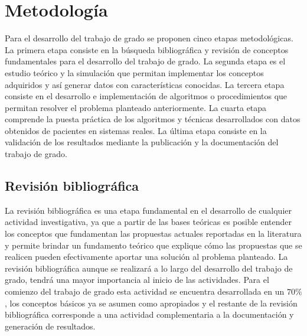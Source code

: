 \section{Metodología}
\label{sec:metodologia}

Para el desarrollo del trabajo de grado se proponen cinco etapas metodológicas. La primera etapa consiste en la búsqueda bibliográfica y revisión de conceptos fundamentales para el desarrollo del trabajo de grado. La segunda etapa es el estudio teórico y la simulación que permitan implementar los conceptos adquiridos y así generar datos con características conocidas. La tercera etapa consiste en el desarrollo e implementación de algoritmos o procedimientos que permitan resolver el problema planteado anteriormente. La cuarta etapa comprende la puesta práctica de los algoritmos y técnicas desarrollados con datos obtenidos de pacientes en sistemas reales. La última etapa consiste en la validación de los resultados mediante la publicación y la documentación del trabajo de grado.

\subsection{Revisión bibliográfica}


La revisión bibliográfica es una etapa fundamental en el desarrollo de cualquier actividad investigativa, ya que a partir de las bases teóricas es posible entender los conceptos que fundamentan las propuestas actuales reportadas en la literatura y permite brindar un fundamento teórico que explique cómo las propuestas que se realicen pueden efectivamente aportar una solución al problema planteado. La revisión bibliográfica aunque se realizará a lo largo del desarrollo del trabajo de grado, tendrá una mayor importancia al inicio de las actividades. Para el comienzo del trabajo de grado esta actividad se encuentra desarrollada en un $70\%$, los conceptos básicos ya se asumen como apropiados y el restante de la revisión bibliográfica corresponde a una actividad complementaria a la documentación y generación de resultados.

